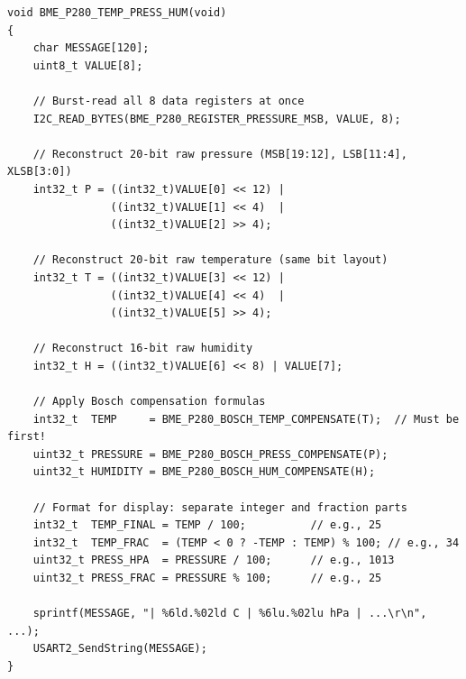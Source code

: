 \documentclass[12pt, a4paper]{article}
\begin{document}
\begin{codebox}
\begin{lstlisting}[style=CStyle]
void BME_P280_TEMP_PRESS_HUM(void)
{
    char MESSAGE[120];
    uint8_t VALUE[8];

    // Burst-read all 8 data registers at once
    I2C_READ_BYTES(BME_P280_REGISTER_PRESSURE_MSB, VALUE, 8);

    // Reconstruct 20-bit raw pressure (MSB[19:12], LSB[11:4], XLSB[3:0])
    int32_t P = ((int32_t)VALUE[0] << 12) |
                ((int32_t)VALUE[1] << 4)  |
                ((int32_t)VALUE[2] >> 4);

    // Reconstruct 20-bit raw temperature (same bit layout)
    int32_t T = ((int32_t)VALUE[3] << 12) |
                ((int32_t)VALUE[4] << 4)  |
                ((int32_t)VALUE[5] >> 4);

    // Reconstruct 16-bit raw humidity
    int32_t H = ((int32_t)VALUE[6] << 8) | VALUE[7];

    // Apply Bosch compensation formulas
    int32_t  TEMP     = BME_P280_BOSCH_TEMP_COMPENSATE(T);  // Must be first!
    uint32_t PRESSURE = BME_P280_BOSCH_PRESS_COMPENSATE(P);
    uint32_t HUMIDITY = BME_P280_BOSCH_HUM_COMPENSATE(H);

    // Format for display: separate integer and fraction parts
    int32_t  TEMP_FINAL = TEMP / 100;          // e.g., 25
    int32_t  TEMP_FRAC  = (TEMP < 0 ? -TEMP : TEMP) % 100; // e.g., 34
    uint32_t PRESS_HPA  = PRESSURE / 100;      // e.g., 1013
    uint32_t PRESS_FRAC = PRESSURE % 100;      // e.g., 25

    sprintf(MESSAGE, "| %6ld.%02ld C | %6lu.%02lu hPa | ...\r\n", ...);
    USART2_SendString(MESSAGE);
}
\end{lstlisting}
\end{codebox}
\end{document}
